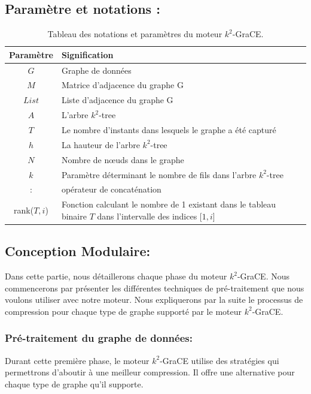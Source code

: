 \documentclass[a4paper,oneside,12pt]{report}
\theoremstyle{definition}
\begin{document}
		\subsection{Paramètre et notations :}
				
		\begin{table}[H]
		\centering
		\begin{tabular}{|c|L{12cm}|}
		\hline Paramètre & Signification \\ \hline\hline 
		$G$ & Graphe de données \\ \hline
		$M$ & Matrice d'adjacence du graphe G\\ \hline
		$List$ & Liste d'adjacence du graphe G\\ \hline
		$A$ & L'arbre $k^2$-tree \\\hline
		$T$ & Le nombre d'instants dans lesquels le graphe a été capturé \\\hline
		$h$ & La hauteur de l'arbre $k^2$-tree \\ \hline
		$N$ & Nombre de nœuds dans le graphe \\ \hline
		$k$ & Paramètre déterminant le nombre de fils dans l'arbre $k^2$-tree\\ \hline
		: & opérateur de concaténation \\ \hline
		rank($T,i$) &  Fonction calculant le nombre de 1 existant dans le tableau binaire $T$ dans l'intervalle des indices [$1,i$] \\ \hline
		\end{tabular}
		\caption{Tableau des notations et paramètres du moteur $k^2$-GraCE.}	
		\label{notk2grace}		
	\end{table}
	
		\subsection{Conception Modulaire:}
		
		Dans cette partie, nous détaillerons chaque phase du moteur $k^2$-GraCE. Nous commencerons par présenter les différentes techniques de pré-traitement 
		que nous voulons utiliser avec notre moteur. Nous expliquerons par la suite le processus de compression pour chaque type de graphe supporté par le moteur $k^2$-GraCE. %
		
			\subsubsection{Pré-traitement du graphe de données:}
Durant cette première phase, le moteur $k^2$-GraCE utilise des stratégies qui permettrons d'aboutir à une meilleur compression. Il offre une alternative pour chaque type de graphe qu'il supporte. 		
			
\end{document}
